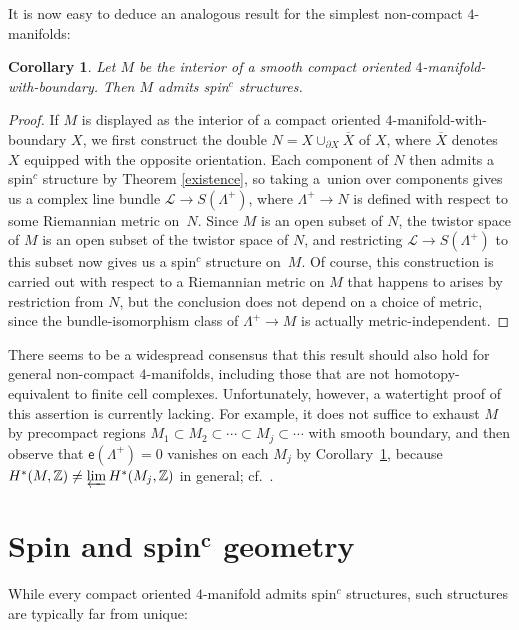 \documentclass[pdftex]{sigma}
\numberwithin{equation}{section}
\newtheorem{Corollary}[Theorem]{Corollary}
\def\ZZ{\mathbb{Z}}
\begin{document}
It is now easy to deduce an analogous result for the simplest non-compact $4$-manifolds:

\begin{Corollary}\label{intern}
 Let $M$ be the interior of a smooth compact oriented $4$-manifold-with-boundary. Then $M$ admits spin$^c$ structures.
\end{Corollary}
\begin{proof} If $M$ is displayed as the interior of a compact oriented $4$-manifold-with-boundary $X$,
we first construct the double
 $N= X\cup_{\partial X} \overline{X}$ of $X$, where $\overline{X}$ denotes $X$ equipped with the
opposite orientation. Each component of $N$ then admits a spin$^c$ structure by Theorem \ref{existence},
so taking a~union over components
 gives us a complex line bundle $\mathscr{L}\to S(\Lambda^+)$, where
 $\Lambda^+\to N$ is defined with respect to some Riemannian metric on~$N$. Since $M$ is an open subset of
 $N$, the twistor space of $M$ is an open subset of the twistor space of $N$, and restricting $\mathscr{L}\to S(\Lambda^+)$
 to this subset now gives us a spin$^c$ structure on~$M$. Of course, this construction is carried out with respect to a Riemannian metric
on $M$ that happens to arises by
 restriction from $N$, but the conclusion does not depend on a choice of metric, since the bundle-isomorphism class of
$\Lambda^+\to M$ is actually metric-independent. \end{proof}

There seems to be a widespread consensus \cite{gost,krees} that this result should also hold for general
non-compact $4$-manifolds, including those that are not homotopy-equivalent to finite cell complexes.
Unfortunately, however, a watertight proof of this assertion is currently lacking.
For example, it does not suffice to exhaust $M$ by precompact regions
 $M_1 \subset M_2 \subset \cdots \subset M_j \subset \cdots$ with smooth boundary, and then
observe that $\mathsf{e} (\Lambda^+)=0$ vanishes on each $M_j$ by Corollary~\ref{intern},
because $H^* (M,\ZZ)\neq \varprojlim H^*(M_j,\ZZ)$
 in general; cf.\ \cite[p.~109]{milnorstaf}.

\section[Spin and spin c geometry]{Spin and spin$\boldsymbol{{}^c}$ geometry}\label{products}

While every compact oriented $4$-manifold admits spin$^c$ structures, such structures are typically far from unique:
\end{document}

